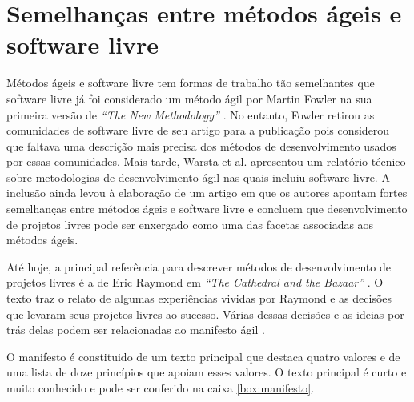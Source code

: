 \chapter{Semelhanças entre métodos ágeis e software livre}
\label{cap:semelhancas}

Métodos ágeis e software livre tem formas de trabalho tão semelhantes
que software livre já foi considerado um método ágil por Martin Fowler
na sua primeira versão de \emph{``The New Methodology''}
\cite{Fowler00orig}. No entanto, Fowler retirou as comunidades de
software livre de seu artigo para a publicação pois considerou que
faltava uma descrição mais precisa dos métodos de desenvolvimento
usados por essas comunidades. Mais tarde, Warsta et
al. \cite{Warsta2002} apresentou um relatório técnico sobre
metodologias de desenvolvimento ágil nas quais incluiu software
livre. A inclusão ainda levou à elaboração de um artigo
\cite{Warsta2003} em que os autores apontam fortes semelhanças entre
métodos ágeis e software livre e concluem que desenvolvimento de
projetos livres pode ser enxergado como uma das facetas associadas aos
métodos ágeis.

Até hoje, a principal referência para descrever métodos de
desenvolvimento de projetos livres é a de Eric Raymond em \emph{``The
  Cathedral and the Bazaar''} \cite{Raymond1999}. O texto traz o
relato de algumas experiências vividas por Raymond e as decisões que
levaram seus projetos livres ao sucesso. Várias dessas decisões e as
ideias por trás delas podem ser relacionadas ao manifesto ágil
\cite{AgileManifesto}.

O manifesto é constituido de um texto principal que destaca quatro
valores e de uma lista de doze princípios que apoiam esses valores. O
texto principal é curto e muito conhecido e pode ser conferido na
caixa \ref{box:manifesto}.

